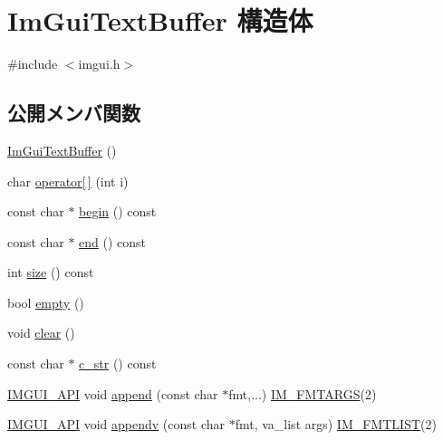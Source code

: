 \hypertarget{struct_im_gui_text_buffer}{}\section{Im\+Gui\+Text\+Buffer 構造体}
\label{struct_im_gui_text_buffer}


{\ttfamily \#include $<$imgui.\+h$>$}

\subsection*{公開メンバ関数}
\begin{DoxyCompactItemize}
\item 
\mbox{\hyperlink{struct_im_gui_text_buffer_a4c4369c5e65f591554428b947c498d0d}{Im\+Gui\+Text\+Buffer}} ()
\item 
char \mbox{\hyperlink{struct_im_gui_text_buffer_a8550f53463fd12711e3d08b740227bd4}{operator\mbox{[}$\,$\mbox{]}}} (int i)
\item 
const char $\ast$ \mbox{\hyperlink{struct_im_gui_text_buffer_aab6d83c6b9a8061287a4cb6135c1cab4}{begin}} () const
\item 
const char $\ast$ \mbox{\hyperlink{struct_im_gui_text_buffer_a2fc30ad0d384f98dfcea722f798d91f2}{end}} () const
\item 
int \mbox{\hyperlink{struct_im_gui_text_buffer_a2811fcd43e0224eb3bd0f3464b634289}{size}} () const
\item 
bool \mbox{\hyperlink{struct_im_gui_text_buffer_afdef38ae725bb5495f0143170fa902c8}{empty}} ()
\item 
void \mbox{\hyperlink{struct_im_gui_text_buffer_a9e4edc9f950bc9e35d5c3b3071dbc0df}{clear}} ()
\item 
const char $\ast$ \mbox{\hyperlink{struct_im_gui_text_buffer_afb03439bc91723e274bfb9d247a691b9}{c\+\_\+str}} () const
\item 
\mbox{\hyperlink{imgui_8h_a43829975e84e45d1149597467a14bbf5}{I\+M\+G\+U\+I\+\_\+\+A\+PI}} void \mbox{\hyperlink{struct_im_gui_text_buffer_a791ac3e5638c58b53772e14bee1323db}{append}} (const char $\ast$fmt,...) \mbox{\hyperlink{imgui_8h_a1251c2f9ddac0873dbad8181bd82c9f1}{I\+M\+\_\+\+F\+M\+T\+A\+R\+GS}}(2)
\item 
\mbox{\hyperlink{imgui_8h_a43829975e84e45d1149597467a14bbf5}{I\+M\+G\+U\+I\+\_\+\+A\+PI}} void \mbox{\hyperlink{struct_im_gui_text_buffer_ad7c7e0d7ec1a12dd2a96a3dbb204deaf}{appendv}} (const char $\ast$fmt, va\+\_\+list args) \mbox{\hyperlink{imgui_8h_a047693beb7f899f5deab1e20202016b3}{I\+M\+\_\+\+F\+M\+T\+L\+I\+ST}}(2)
\end{DoxyCompactItemize}
